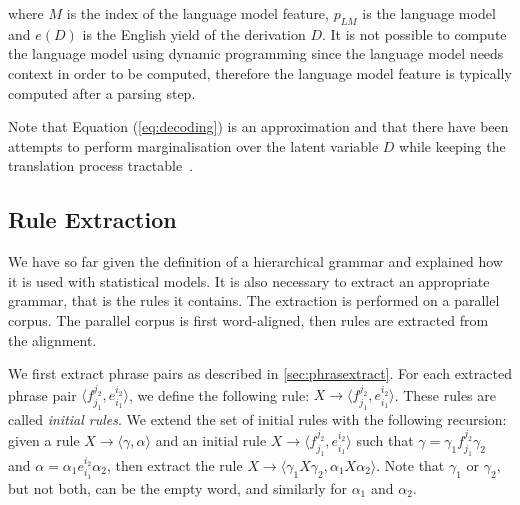    \noindent where $M$ is the index of the language model feature, $p_{LM}$ is the language model and $e(D)$ is the English
    yield of the derivation $D$. It is not possible to compute the language model using dynamic programming since
    the language model needs context in order to be computed, therefore the language model feature is typically
    computed after a parsing step. %
    
    Note that Equation (\ref{eq:decoding}) is an approximation and that there have been attempts to perform marginalisation over the latent variable 
    $D$ while keeping the translation process tractable~\citep{blunsom-cohn-osborne:2008:ACL,degispert-iglesias-blackwood-banga-byrne:2010:CL}.


  \subsection{Rule Extraction} \label{sec:hierruleextract}

  We have so far given the definition of a hierarchical grammar and explained how it is used with statistical models.
  It is also necessary to extract an appropriate grammar, that is the rules it contains. The extraction
  is performed on a parallel corpus. The parallel corpus is first word-aligned, then
  rules are extracted from the alignment.

  We first extract phrase pairs as described in \autoref{sec:phrasextract}.
  For each extracted phrase pair $\langle f_{j_1}^{j_2}, e_{i_1}^{i_2} \rangle$,
  we define the following
  rule: $X \rightarrow \langle f_{j_1}^{j_2},e_{i_1}^{i_2} \rangle$.
  These rules are called {\em initial rules}.
      We extend the set of initial rules with the following recursion: given a rule  $X \rightarrow \langle \gamma, \alpha \rangle$
      and an initial rule $X \rightarrow \langle f_{j_1}^{j_2},e_{i_1}^{i_2} \rangle$ such that $\gamma = \gamma_1 f_{j_1}^{j_2} \gamma_2$
      and $\alpha = \alpha_1 e_{i_1}^{i_2} \alpha_2$, then extract the rule $X \rightarrow \langle \gamma_1 X \gamma_2, \alpha_1 X \alpha_2 \rangle$.
      Note that $\gamma_1$ or $\gamma_2$, but not both, can be the empty word, and similarly for $\alpha_1$ and $\alpha_2$.

